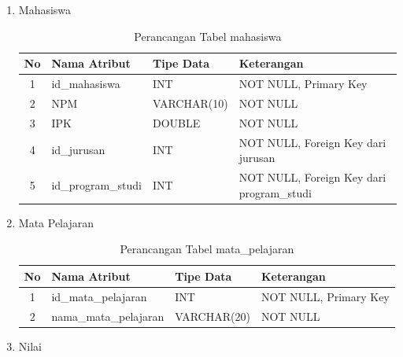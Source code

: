 \begin{enumerate}
    \item Mahasiswa
        
        \begin{table}[H]
            \centering
            \begin{tabular}{|c|p{4cm}|p{4cm}|p{4cm}|}
                \hline
                No & Nama Atribut & Tipe Data & Keterangan \\
                \hline
                1 & id\_mahasiswa & INT & NOT NULL, Primary Key \\
                \hline
                2 & NPM & VARCHAR(10) & NOT NULL \\
                \hline
                3 & IPK & DOUBLE & NOT NULL\\
                \hline
                4 & id\_jurusan & INT & NOT NULL, Foreign Key dari jurusan\\
                \hline
                5 & id\_program\_studi & INT & NOT NULL, Foreign Key  dari program\_studi \\
                \hline
            \end{tabular}
            \caption{Perancangan Tabel mahasiswa}
            \label{tab:perancangan tabel mahasiswa}
        \end{table}
        
    \item Mata Pelajaran
        
        \begin{table}[H]
            \centering
            \begin{tabular}{|c|p{4cm}|p{4cm}|p{4cm}|}
                \hline
                No & Nama Atribut & Tipe Data & Keterangan \\
                \hline
                1 & id\_mata\_pelajaran & INT & NOT NULL, Primary Key \\
                \hline
                2 & nama\_mata\_pelajaran & VARCHAR(20) & NOT NULL\\
                \hline
            \end{tabular}
            \caption{Perancangan Tabel mata\_pelajaran}
            \label{tab:perancangan tabel mata pelajaran}
        \end{table}
        
    \item Nilai
    

\end{enumerate}
